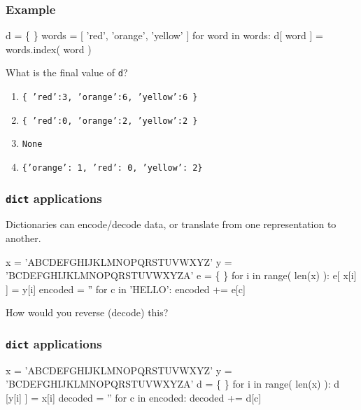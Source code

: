 \documentclass[11pt]{beamer}
\begin{document}
\begin{frame}[fragile]
  \frametitle{Example}
  \Enlarge

  \begin{semiverbatim}
d = \{ \}
words = [ 'red', 'orange', 'yellow' ]
for word in words:
    d[ word ] = words.index( word )
  \end{semiverbatim}
  What is the final value of \texttt{d}?
  \begin{enumerate}[label=\Alph*]
  \item  \texttt{\{ 'red':3, 'orange':6, 'yellow':6 \}}
  \item  \texttt{\{ 'red':0, 'orange':2, 'yellow':2 \}}
  \item  \texttt{None}
  \item  \texttt{\{'orange': 1, 'red': 0, 'yellow': 2\}}
  \end{enumerate}
\end{frame}

\begin{frame}[fragile]
  \frametitle{\texttt{dict} applications}
  \Enlarge

  \begin{itemize}
  \myitem  Dictionaries can encode/decode data, or translate from one representation to another.
  \end{itemize}
  \begin{semiverbatim}
x = 'ABCDEFGHIJKLMNOPQRSTUVWXYZ'
y = 'BCDEFGHIJKLMNOPQRSTUVWXYZA'
e = \{ \}
for i in range( len(x) ):
    e[ x[i] ] = y[i]
encoded = ''
for c in 'HELLO':
    encoded += e[c]
  \end{semiverbatim}
  \begin{itemize}
  \myitem  How would you reverse (decode) this?
  \end{itemize}
\end{frame}

\begin{frame}[fragile]
  \frametitle{\texttt{dict} applications}
  \Enlarge

  \begin{semiverbatim}
x = 'ABCDEFGHIJKLMNOPQRSTUVWXYZ'
y = 'BCDEFGHIJKLMNOPQRSTUVWXYZA'
d = \{ \}
for i in range( len(x) ):
    d [y[i] ] = x[i]
decoded = ''
for c in encoded:
    decoded += d[c]
  \end{semiverbatim}
\end{frame}
\end{document}
